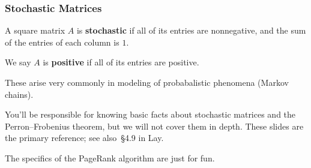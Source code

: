 

\usetikzlibrary{bending,matrix}




\begin{frame}
\frametitle{Stochastic Matrices}

\vskip-3mm
\begin{defn}
  A square matrix $A$ is \textbf{stochastic} if all of its entries are
  nonnegative, and the sum of the entries of each column is $1$.

  \pause\smallskip
  We say $A$ is \textbf{positive} if all of its entries are positive.
\end{defn}

\pause\medskip
These arise very commonly in modeling of probabalistic phenomena (Markov
chains).

\pause\vfill
\begin{bluebox}{.7\linewidth}
  You'll be responsible for knowing basic facts about stochastic matrices and
  the Perron--Frobenius theorem, but we will not cover them in depth.  These
  slides are the primary reference; see also~\S4.9 in Lay.

  \medskip
  The specifics of the PageRank algorithm are just for fun.
\end{bluebox}

\end{frame}



